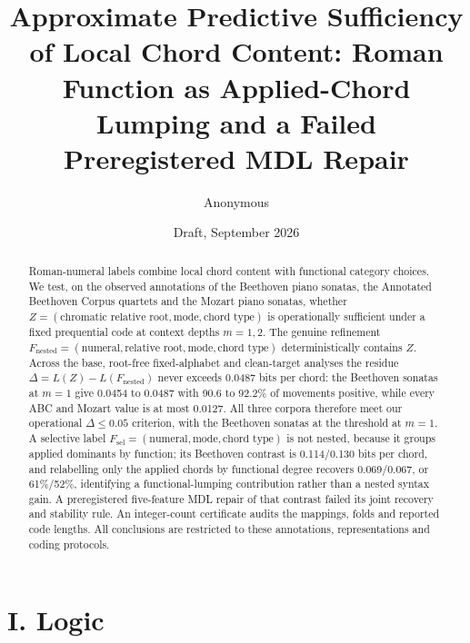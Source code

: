 \documentclass[11pt]{article}
\title{Approximate Predictive Sufficiency of Local Chord Content: Roman Function as Applied-Chord Lumping and a Failed Preregistered MDL Repair}
\author{Anonymous}
\date{Draft, September 2026}
\begin{document}
\maketitle

\begin{abstract}
Roman-numeral labels combine local chord content with functional category choices. We test, on the observed annotations of the Beethoven piano sonatas, the Annotated Beethoven Corpus quartets and the Mozart piano sonatas, whether $Z=(\text{chromatic relative root},\text{mode},\text{chord type})$ is operationally sufficient under a fixed prequential code at context depths $m=1,2$. The genuine refinement $F_{\mathrm{nested}}=(\text{numeral},\text{relative root},\text{mode},\text{chord type})$ deterministically contains $Z$. Across the base, root-free fixed-alphabet and clean-target analyses the residue $\Delta=L(Z)-L(F_{\mathrm{nested}})$ never exceeds 0.0487 bits per chord: the Beethoven sonatas at $m=1$ give 0.0454 to 0.0487 with 90.6 to 92.2\% of movements positive, while every ABC and Mozart value is at most 0.0127. All three corpora therefore meet our operational $\Delta\le 0.05$ criterion, with the Beethoven sonatas at the threshold at $m=1$. A selective label $F_{\mathrm{sel}}=(\text{numeral},\text{mode},\text{chord type})$ is not nested, because it groups applied dominants by function; its Beethoven contrast is 0.114/0.130 bits per chord, and relabelling only the applied chords by functional degree recovers 0.069/0.067, or 61\%/52\%, identifying a functional-lumping contribution rather than a nested syntax gain. A preregistered five-feature MDL repair of that contrast failed its joint recovery and stability rule. An integer-count certificate audits the mappings, folds and reported code lengths. All conclusions are restricted to these annotations, representations and coding protocols.
\end{abstract}

\part*{I. Logic}
\end{document}
